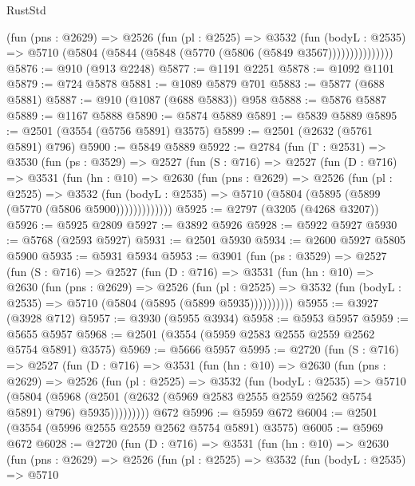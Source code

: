 \begin{lexlean}{RustStd}
\begin{coremodule}
                (fun (pns : @2629) =>
                @2526
                  (fun (pl : @2525) =>
                  @3532
                    (fun (bodyL : @2535) =>
                    @5710 (@5804 (@5844 (@5848 (@5770 (@5806 (@5849 @3567)))))))))))))))
@5876 := @910 (@913 @2248)
@5877 := @1191 @2251
@5878 := @1092 @1101
@5879 := @724 @5878
@5881 := @1089 @5879 @701
@5883 := @5877 (@688 @5881)
@5887 := @910 (@1087 (@688 @5883)) @958
@5888 := @5876 @5887
@5889 := @1167 @5888
@5890 := @5874 @5889
@5891 := @5839 @5889
@5895 := @2501 (@3554 (@5756 @5891) @3575)
@5899 := @2501 (@2632 (@5761 @5891) @796)
@5900 := @5849 @5889
@5922 := @2784
    (fun (Γ : @2531) =>
    @3530
      (fun (ps : @3529) =>
      @2527
        (fun (S : @716) =>
        @2527
          (fun (D : @716) =>
          @3531
            (fun (hn : @10) =>
            @2630
              (fun (pns : @2629) =>
              @2526
                (fun (pl : @2525) =>
                @3532
                  (fun (bodyL : @2535) =>
                  @5710 (@5804 (@5895 (@5899 (@5770 (@5806 @5900)))))))))))))
@5925 := @2797 (@3205 (@4268 @3207))
@5926 := @5925 @2809
@5927 := @3892 @5926
@5928 := @5922 @5927
@5930 := @5768 (@2593 @5927)
@5931 := @2501 @5930
@5934 := @2600 @5927 @5805 @5900
@5935 := @5931 @5934
@5953 := @3901
    (fun (ps : @3529) =>
    @2527
      (fun (S : @716) =>
      @2527
        (fun (D : @716) =>
        @3531
          (fun (hn : @10) =>
          @2630
            (fun (pns : @2629) =>
            @2526
              (fun (pl : @2525) =>
              @3532 (fun (bodyL : @2535) => @5710 (@5804 (@5895 (@5899 @5935))))))))))
@5955 := @3927 (@3928 @712)
@5957 := @3930 (@5955 @3934)
@5958 := @5953 @5957
@5959 := @5655 @5957
@5968 := @2501 (@3554 (@5959 @2583 @2555 @2559 @2562 @5754 @5891) @3575)
@5969 := @5666 @5957
@5995 := @2720
    (fun (S : @716) =>
    @2527
      (fun (D : @716) =>
      @3531
        (fun (hn : @10) =>
        @2630
          (fun (pns : @2629) =>
          @2526
            (fun (pl : @2525) =>
            @3532
              (fun (bodyL : @2535) =>
              @5710
                (@5804
                  (@5968
                    (@2501 (@2632 (@5969 @2583 @2555 @2559 @2562 @5754 @5891) @796) @5935)))))))))
    @672
@5996 := @5959 @672
@6004 := @2501 (@3554 (@5996 @2555 @2559 @2562 @5754 @5891) @3575)
@6005 := @5969 @672
@6028 := @2720
    (fun (D : @716) =>
    @3531
      (fun (hn : @10) =>
      @2630
        (fun (pns : @2629) =>
        @2526
          (fun (pl : @2525) =>
          @3532
            (fun (bodyL : @2535) =>
            @5710

\end{coremodule}
\end{lexlean}
